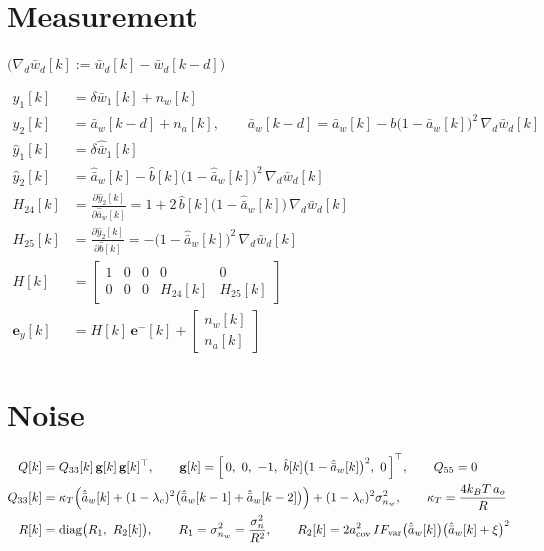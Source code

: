 \documentclass[11pt,a4paper,fontset=none]{ctexart}
\newcommand{\ba}{\bar{a}}
\newcommand{\bw}{\bar{w}}
\newcommand{\ah}{\hat{\ba}_w}
\newcommand{\bh}{\hat{b}}
\begin{document}
\section{Measurement}

$\bigl(\nabla_d\bw_d[k] := \bw_d[k] - \bw_d[k-d]\bigr)$

\begin{align*}
y_1[k]     &= \delta\bw_1[k] + n_w[k] \\
y_2[k]     &= \ba_w[k-d] + n_a[k], \qquad
\ba_w[k-d]  = \ba_w[k] - b\bigl(1-\ba_w[k]\bigr)^{2}\,\nabla_d\bw_d[k] \\
\hat y_1[k] &= \delta\hat{\bw}_1[k] \\
\hat y_2[k] &= \ah[k] - \bh[k]\bigl(1-\ah[k]\bigr)^{2}\,\nabla_d\bw_d[k] \\
H_{24}[k]  &= \frac{\partial \hat y_2[k]}{\partial \ah[k]} = 1 + 2\,\bh[k]\bigl(1-\ah[k]\bigr)\,\nabla_d\bw_d[k] \\
H_{25}[k]  &= \frac{\partial \hat y_2[k]}{\partial \bh[k]} = -\bigl(1-\ah[k]\bigr)^{2}\,\nabla_d\bw_d[k] \\
H[k]       &= \begin{bmatrix} 1 & 0 & 0 & 0 & 0 \\ 0 & 0 & 0 & H_{24}[k] & H_{25}[k] \end{bmatrix} \\
\mathbf{e}_y[k] &= H[k]\,\mathbf{e}^{-}[k] + \begin{bmatrix} n_w[k] \\ n_a[k] \end{bmatrix}
\end{align*}

\section{Noise}

\begin{align*}
Q[k]    &= Q_{33}[k]\,\mathbf{g}[k]\,\mathbf{g}[k]^{\top}, \qquad
\mathbf{g}[k] = \Bigl[\,0,\ 0,\ -1,\ \bh[k]\bigl(1-\ah[k]\bigr)^{2},\ 0\,\Bigr]^{\top}, \qquad Q_{55} = 0 \\
Q_{33}[k] &= \kappa_T\Bigl(\ah[k] + (1-\lambda_c)^{2}\bigl(\ah[k-1] + \ah[k-2]\bigr)\Bigr) + (1-\lambda_c)^{2}\sigma^{2}_{n_w},
\qquad \kappa_T = \frac{4k_BT\,a_o}{R} \\
R[k]    &= \mathrm{diag}\bigl(R_1,\ R_2[k]\bigr), \qquad R_1 = \sigma^{2}_{n_w} = \frac{\sigma^{2}_{n}}{R^{2}}, \qquad
R_2[k] = 2a_{\mathrm{cov}}^{2}\,IF_{\mathrm{var}}\bigl(\ah[k]\bigr)\bigl(\ah[k] + \xi\bigr)^{2}
\end{align*}
\end{document}
